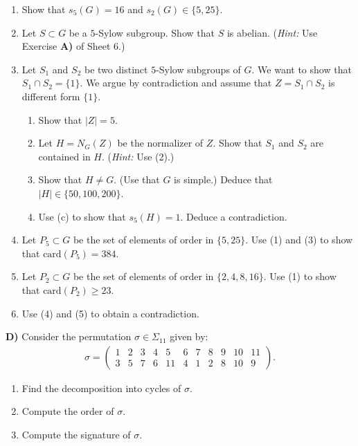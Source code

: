 \documentclass[12pt,a4paper]{article}
\begin{document}
\begin{enumerate}
\item[(1)] Show that $s_5(G)=16$ and $s_2(G)\in\{5,25\}$.
\item[(2)] Let $S\subset G$ be a $5$-Sylow subgroup. Show that $S$ is abelian. (\textit{Hint:} Use Exercise \textbf{A)} of Sheet 6.)
\item[(3)] Let $S_1$ and $S_2$ be two distinct $5$-Sylow subgroups of $G$. We want to show that $S_1\cap S_2=\{1\}$. We argue by contradiction and assume that $Z=S_1\cap S_2$ is different form $\{1\}$.
\begin{enumerate}
\item[(a)] Show that $|Z|=5$.
\item[(b)] Let $H=N_G(Z)$ be the normalizer of $Z$. Show that $S_1$ and $S_2$ are contained in $H$. (\textit{Hint:} Use (2).)
\item[(c)] Show that $H\neq G$. (Use that $G$ is simple.) Deduce that $|H|\in\{50,100,200\}$.
\item[(d)] Use (c) to show that $s_5(H)=1$. Deduce a contradiction.
\end{enumerate}
\item[(4)] Let $P_5\subset G$ be the set of elements of order in $\{5,25\}$. Use (1) and (3) to show that $\mathrm{card}(P_5)=384$.
\item[(5)] Let $P_2\subset G$ be the set of elements of order in $\{2,4,8,16\}$. Use (1) to show that $\mathrm{card}(P_2)\geq 23$.
\item[(6)] Use (4) and (5) to obtain a contradiction.
\end{enumerate}
\newpage
\noindent\textbf{D)} Consider the permutation $\sigma\in\Sigma_{11}$ given by:
\begin{align*}
\sigma=
\begin{pmatrix}
1&2&3&4&5&6&7&8&9&10&11\\
3&5&7&6&11&4&1&2&8&10&9
\end{pmatrix}.
\end{align*}
\begin{enumerate}
\item[(1)] Find the decomposition into cycles of $\sigma$.
\item[(2)] Compute the order of $\sigma$.
\item[(3)] Compute the signature of $\sigma$.
\end{enumerate}
\end{document}
